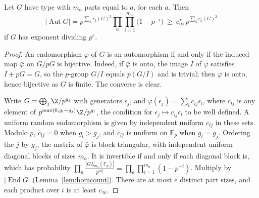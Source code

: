 \begin{lemma}\label{lem:autcount}
Let $G$ have type with $m_a$ parts equal to $a$, for each $a$. Then
\[
|\operatorname{Aut}G|=p^{\sum_kr_k(G)^2}\prod_a\prod_{i=1}^{m_a}\bigl(1-p^{-i}\bigr)\ \ge\ c_\infty^{\,e}\,p^{\sum_kr_k(G)^2}
\]
if $G$ has exponent dividing $p^e$.
\end{lemma}
\begin{proof}
An endomorphism $\varphi$ of $G$ is an automorphism if and only if the induced map $\bar\varphi$ on $G/pG$ is bijective. Indeed, if $\bar\varphi$ is onto, the image $I$ of $\varphi$ satisfies $I+pG=G$, so the $p$-group $G/I$ equals $p(G/I)$ and is trivial; then $\varphi$ is onto, hence bijective as $G$ is finite. The converse is clear.

Write $G=\bigoplus_j\Z/p^{g_j}$ with generators $\epsilon_j$, and $\varphi(\epsilon_j)=\sum_lc_{lj}\epsilon_l$, where $c_{lj}$ is any element of $p^{\max(0,g_l-g_j)}\Z/p^{g_l}$, the condition for $\epsilon_j\mapsto c_{lj}\epsilon_l$ to be well defined. A uniform random endomorphism is given by independent uniform $c_{lj}$ in these sets. Modulo $p$, $\bar c_{lj}=0$ when $g_l>g_j$, and $\bar c_{lj}$ is uniform on $\mathbb F_p$ when $g_l=g_j$. Ordering the $j$ by $g_j$, the matrix of $\bar\varphi$ is block triangular, with independent uniform diagonal blocks of sizes $m_a$. It is invertible if and only if each diagonal block is, which has probability $\prod_a\frac{|GL_{m_a}(\mathbb F_p)|}{p^{m_a^2}}=\prod_a\prod_{i=1}^{m_a}(1-p^{-i})$. Multiply by $|\operatorname{End}G|$ (Lemma~\ref{lem:homcount}). There are at most $e$ distinct part sizes, and each product over $i$ is at least $c_\infty$.
\end{proof}

